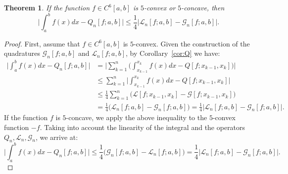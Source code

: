 \documentclass[10pt,a4paper]{amsart}
\newtheorem{thm}{Theorem}
\newcommand{\G}{\mathcal{G}}
\newcommand{\Lob}{\mathcal{L}}
\newcommand{\xle}{\leqslant}
\begin{document}
\begin{thm}\label{th:adaptive}
 If the function $f\in C^6[a,b]$ is $5$-convex or $5$-concave, then
 \[
  \biggl|
   \int_a^b f(x) dx - Q_n[f;a,b]
  \biggr| \xle
  \frac{1}{4}\bigl|\Lob_n[f;a,b] - \G_n[f;a,b] \bigr|.
 \]
\end{thm}

\begin{proof}
 First, assume that $f\in C^6[a,b]$ is $5$-convex. Given the construction of the quadratures $\G_n[f;a,b]$ and $\Lob_n[f;a,b]$, by Corollary~\ref{cor:Q} we have:
 \begin{align*}
  \biggl| \int_a^b f(x) dx - Q_n[f;a,b] \biggr| &=
  \biggl| \sum_{k=1}^n\biggl( \int_{x_{k-1}}^{x_k} f(x) dx - Q[f;x_{k-1},x_k]\biggr)\biggr|\\
  &\xle \sum_{k=1}^n \biggl| \int_{x_{k-1}}^{x_k} f(x) dx - Q[f;x_{k-1},x_k]\biggr|\\
  &\xle \frac{1}{4}\sum_{k=1}^n\bigl(\Lob[f;x_{k-1},x_k]-\G[f;x_{k-1},x_k]\bigr)\\
  &=\frac{1}{4}\bigl(\Lob_n[f;a,b]-\G_n[f;a,b]\bigr)
  =\frac{1}{4}\bigl|\Lob_n[f;a,b] - \G_n[f;a,b] \bigr|.
 \end{align*}
 If the function $f$ is $5$-concave, we apply the above inequality to the $5$-convex function $-f$. Taking into account the linearity of the integral and the operators $Q_n, \Lob_n, \G_n$, we arrive at:
 \[
  \biggl| \int_a^b f(x) dx - Q_n[f;a,b] \biggr| \xle \frac{1}{4}\bigl(\G_n[f;a,b]-\Lob_n[f;a,b]\bigr)=\frac{1}{4}\bigl|\Lob_n[f;a,b] - \G_n[f;a,b] \bigr|.
 \]
\end{proof}
\end{document}
